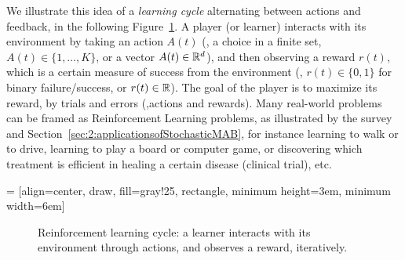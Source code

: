 We illustrate this idea of a \emph{learning cycle} alternating between actions and feedback,
in the following Figure~\ref{fig:1:ReinforcementLearningCycle}.
A player (or learner) interacts with its environment by taking an action $A(t)$ (\eg, a choice in a finite set, $A(t)\in\{1,\dots,K\}$, or a vector $A(t)\in\mathbb{R}^d$), and then observing a reward $r(t)$, which is a certain measure of success from the environment (\eg, $r(t)\in\{0,1\}$ for binary failure/success, or $r(t)\in\mathbb{R}$).
The goal of the player is to maximize its reward, by trials and errors (\ie,actions and rewards).
Many real-world problems can be framed as Reinforcement Learning problems, as illustrated by the survey \cite{bouneffouf2019survey} and Section~\ref{sec:2:applicationsofStochasticMAB}, for instance learning to walk or to drive, learning to play a board or computer game, or discovering which treatment is efficient in healing a certain disease (clinical trial), etc.


 = [align=center, draw, fill=gray!25, rectangle, minimum height=3em, minimum width=6em]
\begin{figure}[h!]
    \centering
\caption{Reinforcement learning cycle: a learner interacts with its environment through actions, and observes a reward, iteratively.}
\label{fig:1:ReinforcementLearningCycle}
\end{figure}


